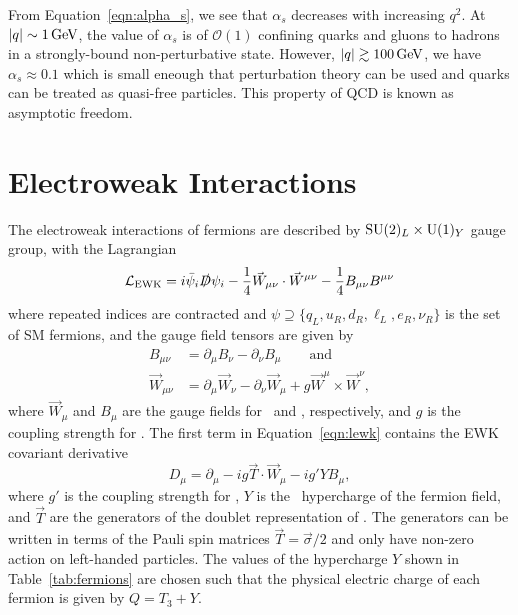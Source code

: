 From Equation~\ref{eqn:alpha_s}, we see that $\alpha_s$ decreases with increasing $q^2$.
At $\lvert q \rvert \sim 1\,\text{Ge\hspace{-.08em}V}$, the value of $\alpha_s$ is of $\mathcal{O}(1)$ confining quarks and gluons to hadrons in a strongly-bound non-perturbative state.
However, $\lvert q \rvert \gtrsim 100\,\text{Ge\hspace{-.08em}V}$, we have $\alpha_s \approx 0.1$ which is small eneough that perturbation theory can be used and quarks can be treated as quasi-free particles.
This property of QCD is known as asymptotic freedom.

\section{Electroweak Interactions}
\label{subsec:ewk}

The electroweak interactions of fermions are described by $\text{SU}(2)_L \times \text{U}(1)_Y$ gauge group, with the Lagrangian
\begin{equation}
  \label{eqn:lewk}
  \mathcal{L}_{\text{EWK}} = i \bar \psi_i \slashed D \psi_i - \frac{1}{4} \vec W_{\mu\nu} \cdot \vec W^{\mu\nu} - \frac{1}{4} B_{\mu\nu} B^{\mu\nu}
\end{equation}
where repeated indices are contracted and $\psi \supseteq \{q_L, u_R, d_R, \ell_L, e_R, \nu_R\}$ is the set of SM fermions, and the gauge field tensors are given by
\begin{align}
  B_{\mu\nu} & = \partial_\mu B_\nu - \partial_\nu B_\mu \qquad \text{and} \nonumber \\
  \vec W_{\mu\nu} & = \partial_\mu \vec W_\nu - \partial_\nu \vec W_\mu + g \vec W^\mu \times \vec W^\nu ,
\end{align}
where $\vec W_\mu$ and $B_\mu$ are the gauge fields for \sutwo\ and \uone, respectively, and $g$ is the coupling strength for \sutwo.
The first term in Equation~\ref{eqn:lewk} contains the EWK covariant derivative
\begin{equation}
  D_{\mu} = \partial_\mu - i g \vec T \cdot \vec W_\mu - i g' Y B_\mu,
\end{equation}
where $g'$ is the coupling strength for \uone,
$Y$ is the \uone\ hypercharge of the fermion field,
and $\vec T$ are the generators of the doublet representation of \sutwo.
The generators can be written in terms of the Pauli spin matrices $\vec T = \vec \sigma / 2$ and only have non-zero action on left-handed particles. %
The values of the hypercharge $Y$ shown in Table~\ref{tab:fermions} are chosen such that the physical electric charge of each fermion is given by $Q =  T_3 + Y$.

